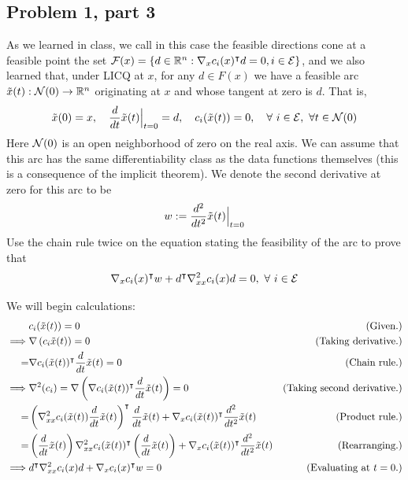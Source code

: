 \subsection{Problem 1, part 3}
As we learned in class, we call in this case the feasible directions cone at a feasible point the set $\mathcal{F}(x) = \{ d \in \mathbb{R}^n : \nabla_x c_i(x)^{\intercal} d = 0, i \in \mathcal{E}\}$, and we also learned that, under LICQ at $x$, for any $d \in F(x)$ we have a feasible arc $\Tilde{x}(t): \mathcal{N}(0) \rightarrow \mathbb{R}^n$ originating at $x$ and whose tangent at zero is $d$. That is, 
\[\Tilde{x}(0) = x, \quad \frac{d}{dt}\Tilde{x}(t) \Big|_{t = 0} = d, \quad c_i(\Tilde{x}(t)) = 0,  \quad \forall \ i \in \mathcal{E}, \ \forall t \in \mathcal{N}(0)\]
Here $\mathcal{N}(0)$ is an open neighborhood of zero on the real axis. We can assume that this arc has the same differentiability class as the data functions themselves (this is a consequence of the implicit theorem). We denote the second derivative at zero for this arc to be 
\[w := \frac{d^2}{dt^2}\Tilde{x}(t)\Big|_{t = 0}\]
Use the chain rule twice on the equation stating the feasibility of the arc to prove that
\[\nabla_x c_i(x)^{\intercal} w + d^{\intercal} \nabla_{xx}^2c_i(x) d = 0, \ \forall \ i \in \mathcal{E}\]
\partbreak
\begin{solution}
    
    We will begin calculations:
    \tightalignbreak
    \begin{align*}
        &c_i(\Tilde{x}(t)) = 0 &\text{(Given.)}\\
        \implies &\nabla\left( c_i\Tilde{x}(t)\right) = 0 &\text{(Taking derivative.)}\\
        =& \nabla c_i(\Tilde{x}(t))^{\intercal} \frac{d}{dt}\Tilde{x}(t) = 0 &\text{(Chain rule.)}\\
        \implies & \nabla^2(c_i) = \nabla\left(\nabla c_i(\Tilde{x}(t))^{\intercal} \frac{d}{dt}\Tilde{x}(t) \right) = 0 &\text{(Taking second derivative.)}\\
        =& \left(\nabla^2_{xx} c_i(\Tilde{x}(t)) \frac{d}{dt}\Tilde{x}(t)\right)^{\intercal} \frac{d}{dt}\Tilde{x}(t) + \nabla_x c_i(\Tilde{x}(t))^{\intercal} \frac{d^2}{dt^2}\Tilde{x}(t) &\text{(Product rule.)}\\
        =&\left(\frac{d}{dt}\Tilde{x}(t)\right)\nabla^2_{xx} c_i(\Tilde{x}(t))^{\intercal}  \left(\frac{d}{dt}\Tilde{x}(t)\right) + \nabla_x c_i(\Tilde{x}(t))^{\intercal} \frac{d^2}{dt^2}\Tilde{x}(t) &\text{(Rearranging.)}\\
        \implies & d^{\intercal} \nabla_{xx}^2c_i(x)d + \nabla_x c_i(x)^{\intercal} w = 0 &\text{(Evaluating at $t = 0$.)}
    \end{align*}\vspace{-12mm}\alignbreak
\end{solution}
\newpage
